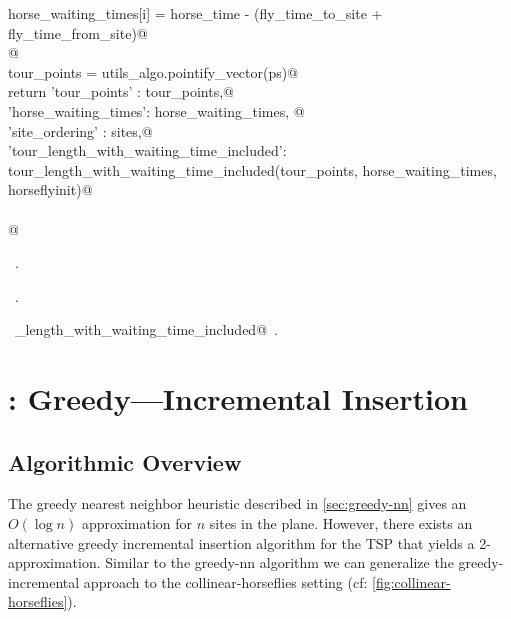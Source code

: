 \documentclass[11.5pt]{report}
\begin{document}
\begin{flushleft}
\begin{list}{}{}
\mbox{}\verb@                horse_waiting_times[i] = horse_time - (fly_time_to_site + fly_time_from_site)@\\
\mbox{}\verb@                @\\
\mbox{}\verb@            tour_points = utils_algo.pointify_vector(ps)@\\
\mbox{}\verb@            return {'tour_points'        : tour_points,@\\
\mbox{}\verb@                    'horse_waiting_times': horse_waiting_times, @\\
\mbox{}\verb@                    'site_ordering'      : sites,@\\
\mbox{}\verb@                    'tour_length_with_waiting_time_included': tour_length_with_waiting_time_included(tour_points, horse_waiting_times, horseflyinit)}@\\
\mbox{}\verb@@\\
\mbox{}\verb@ @\\
\mbox{}\verb@@{\NWsep}
\end{list}
\vspace{-1.5ex}
\footnotesize
\begin{list}{}{\setlength{\itemsep}{-\parsep}\setlength{\itemindent}{-\leftmargin}}
\item \NWtxtMacroDefBy\ .
\item \NWtxtMacroRefIn\ .
\item \NWtxtIdentsUsed\nobreak\  \verb@tour_length_with_waiting_time_included@\nobreak\ .
\item{}
\end{list}
\vspace{4ex}
\end{flushleft}
\section{: Greedy---Incremental Insertion}
\subsection*{Algorithmic Overview}
\newchunk The greedy nearest neighbor heuristic described in \autoref{sec:greedy-nn} gives an $O(\log n)$ 
          approximation for $n$ sites in the plane. However, there exists an alternative greedy incremental 
          insertion algorithm for the TSP that yields a 2-approximation. Similar to the greedy-nn algorithm 
          we can generalize the greedy-incremental approach to the collinear-horseflies setting 
          (cf: \autoref{fig:collinear-horseflies}). 
\end{document}
